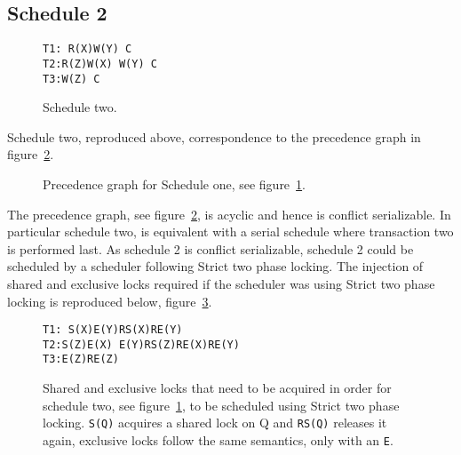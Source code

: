 \documentclass[12pt]{article}
\begin{document}
\subsection*{Schedule 2} 
\begin{figure}[h!]
\texttt{T1: R(X)\hspace{150pt}W(Y) C\\
T2:\hspace{130pt}R(Z)\hspace{120pt}W(X) W(Y) C\\
T3:\hspace{50pt}W(Z) C}
\caption{Schedule two.}
\label{sch2}
\end{figure}
Schedule two, reproduced above, correspondence to the precedence graph in figure~\ref{p2}.
\begin{figure}[h!]
\centering
{}
\caption{Precedence graph for Schedule one, see figure~\ref{sch2}.}
\label{p2}
\end{figure}
The precedence graph, see figure~\ref{p2}, is acyclic and hence is conflict serializable. In particular schedule two, is equivalent with a serial schedule where transaction two is performed last. As schedule 2 is conflict serializable, schedule 2 could be scheduled by a scheduler following Strict two phase locking. The injection of shared and exclusive locks required if the scheduler was using Strict two phase locking is reproduced below, figure~\ref{locks}.
\begin{figure}[h!]
\texttt{T1: S(X)\hspace{95pt}E(Y)RS(X)RE(Y)\\
T2:\hspace{105pt}S(Z)\hspace{90pt}E(X) E(Y)RS(Z)RE(X)RE(Y)\\
T3:\hspace{50pt}E(Z)RE(Z)}
\label{locks}
\caption{Shared and exclusive locks that need to be acquired in order for schedule two, see figure~\ref{sch2}, to be scheduled using Strict two phase locking. \texttt{S(Q)} acquires a shared lock on Q and \texttt{RS(Q)} releases it again, exclusive locks follow the same semantics, only with an \texttt{E}.}
\end{figure}
\end{document}
